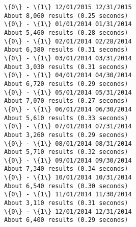 \documentclass[11pt]{article}
\begin{document}
\begin{Verbatim}[commandchars=\\\{\}]
\{0\} - \{1\} 12/01/2015 12/31/2015
About 8,060 results (0.25 seconds) 
\{0\} - \{1\} 01/01/2014 01/31/2014
About 5,460 results (0.28 seconds) 
\{0\} - \{1\} 02/01/2014 02/28/2014
About 6,380 results (0.31 seconds) 
\{0\} - \{1\} 03/01/2014 03/31/2014
About 3,030 results (0.31 seconds) 
\{0\} - \{1\} 04/01/2014 04/30/2014
About 6,720 results (0.29 seconds) 
\{0\} - \{1\} 05/01/2014 05/31/2014
About 7,070 results (0.27 seconds) 
\{0\} - \{1\} 06/01/2014 06/30/2014
About 5,610 results (0.33 seconds) 
\{0\} - \{1\} 07/01/2014 07/31/2014
About 3,260 results (0.29 seconds) 
\{0\} - \{1\} 08/01/2014 08/31/2014
About 5,710 results (0.32 seconds) 
\{0\} - \{1\} 09/01/2014 09/30/2014
About 7,340 results (0.34 seconds) 
\{0\} - \{1\} 10/01/2014 10/31/2014
About 6,540 results (0.30 seconds) 
\{0\} - \{1\} 11/01/2014 11/30/2014
About 3,110 results (0.31 seconds) 
\{0\} - \{1\} 12/01/2014 12/31/2014
About 6,400 results (0.29 seconds) 

    \end{Verbatim}
\end{document}

